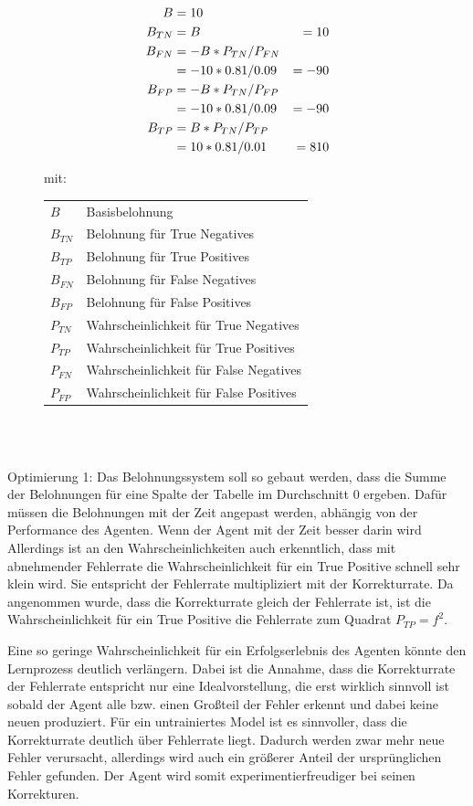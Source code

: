 \documentclass[oneside,bibliography=totocnumbered,BCOR=5mm]{scrbook}%
\makeatletter
\theoremstyle{definition}
\theoremstyle{definition}
\theoremstyle{definition}
\theoremstyle{definition}
\theoremstyle{definition}
\theoremstyle{definition}
\newenvironment{conditions}[1][mit:]
  {#1 \begin{tabular}[t]{>{$}l<{$} @{${}={}$} l}}
  {\end{tabular}\\[\belowdisplayskip]}
\makeatother
\begin{document}
\begin{figure}
\begin{align*}
  B &= 10 \\
  B_{TN} &= B & = 10 \\
  B_{FN} &= - B * P_{TN} / P_{FN} \\
  &= -10 * 0.81 / 0.09 &= -90 \notag\\
  B_{FP} &= - B * P_{TN} / P_{FP} \\
  &= -10 * 0.81 / 0.09 &= -90 \notag\\
  B_{TP} &= B * P_{TN} / P_{TP} \\
  &= 10 * 0.81 / 0.01 &= 810 \notag\\
\end{align*} 


\begin{conditions}
  B & Basisbelohnung \\
  B_{TN} & Belohnung für True Negatives \\
  B_{TP} & Belohnung für True Positives \\
  B_{FN} & Belohnung für False Negatives \\
  B_{FP} & Belohnung für False Positives \\
  P_{TN} & Wahrscheinlichkeit für True Negatives \\
  P_{TP} & Wahrscheinlichkeit für True Positives \\
  P_{FN} & Wahrscheinlichkeit für False Negatives \\
  P_{FP} & Wahrscheinlichkeit für False Positives
\end{conditions}

\end{figure}
\leavevmode \\


Optimierung 1:
Das Belohnungssystem soll so gebaut werden, dass die Summe der Belohnungen für eine Spalte der Tabelle
im Durchschnitt 0 ergeben. Dafür müssen die Belohnungen mit der Zeit angepast werden, abhängig von der
Performance des Agenten. Wenn der Agent mit der Zeit besser darin wird 
Allerdings ist an den Wahrscheinlichkeiten auch erkenntlich, 
dass mit abnehmender Fehlerrate die Wahrscheinlichkeit für ein True Positive schnell sehr klein wird.
Sie entspricht der Fehlerrate multipliziert mit der Korrekturrate.
Da angenommen wurde, dass die Korrekturrate gleich der Fehlerrate ist, ist die Wahrscheinlichkeit
für ein True Positive die Fehlerrate zum Quadrat \(P_{TP} = f^2\). 

Eine so geringe Wahrscheinlichkeit für ein Erfolgserlebnis des Agenten könnte den Lernprozess deutlich verlängern.
Dabei ist die Annahme, dass die Korrekturrate der Fehlerrate entspricht nur eine Idealvorstellung, die erst wirklich sinnvoll
ist sobald der Agent alle bzw. einen Großteil der Fehler erkennt und dabei keine neuen produziert.
Für ein untrainiertes Model ist es sinnvoller, dass die Korrekturrate deutlich über Fehlerrate liegt. 
Dadurch werden zwar mehr neue Fehler verursacht, allerdings wird auch ein größerer Anteil der ursprünglichen Fehler
gefunden. Der Agent wird somit experimentierfreudiger bei seinen Korrekturen.
\end{document}

